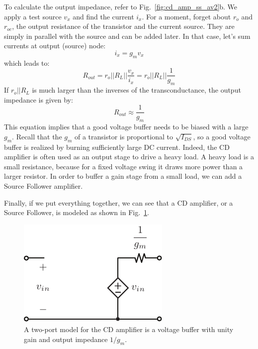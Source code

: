 To calculate the output impedance, refer to Fig.~\ref{fig:cd_amp_ss_av2}b.  We apply a test source $v_x$ and find the current $i_x$.  For a moment, forget about $r_o$ and $r_{oc}$, the output resistance of the transistor and the current source.  They are simply in parallel with the source and can be added later.  In that case, let's sum currents at output (source) node:
% 
\begin{equation}{i_x} = {g_m}{v_x}\end{equation}
%
which leads to:
%
\begin{equation}
	{R_{out}} = {r_o}||{R_L}||\frac{{{v_x}}}{{{i_x}}} = {r_o}||{R_L}||\frac{1}{g_m}
\end{equation}
%
If $r_o || R_L$ is much larger than the inverses of the transconductance, the output impedance is given by:
%
\begin{equation}
	{R_{out}} \approx \frac{1}{{{g_m}}}
\end{equation}
%
This equation implies that a good voltage buffer needs to be biased with a large $g_m$.  Recall that the $g_m$ of a transistor is proportional to $\sqrt{I_{DS}}$, so a good voltage buffer is realized by burning sufficiently large DC current.  Indeed, the CD amplifier is often used as an output stage to drive a heavy load.  A heavy load is a small resistance, because for a fixed voltage swing it draws more power than a larger resistor.  In order to buffer a gain stage from a small load, we can add a Source Follower amplifier.  

Finally, if we put everything together, we can see that a CD amplifier, or a Source Follower, is modeled as shown in Fig.~\ref{fig:cd_amp_model}.  







\begin{figure}[tb]
\begin{center}
\includegraphics[scale=1]{cd_amp_model}
\end{center}
\caption{A two-port model for the CD amplifier is a voltage buffer with unity gain and output impedance $1/g_m$.} \label{fig:cd_amp_model}
\end{figure}

